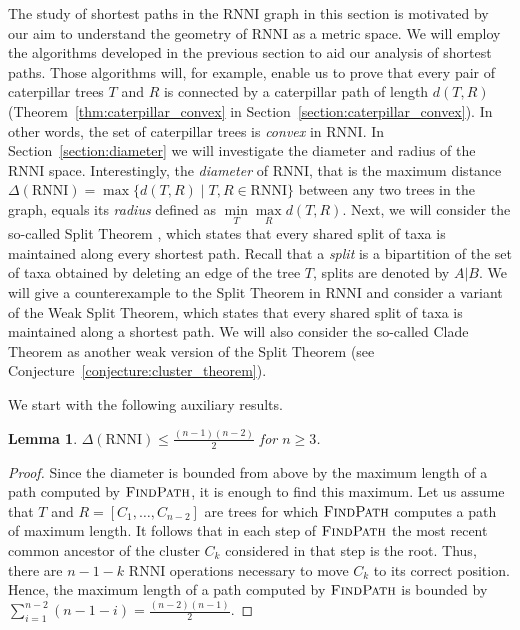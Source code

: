 \documentclass{amsart}
\newcommand{\rnni}{\mathrm{RNNI}}
\newcommand{\findpath}{\textsc{FindPath}}
\newtheorem{lemma}[definition]{Lemma}
\begin{document}
The study of shortest paths in the $\rnni$ graph in this section is motivated by our aim to understand the geometry of $\rnni$ as a metric space.
We will employ the algorithms developed in the previous section to aid our analysis of shortest paths.
Those algorithms will, for example, enable us to prove that every pair of caterpillar trees $T$ and $R$ is connected by a caterpillar path of length $d(T,R)$ (Theorem~\ref{thm:caterpillar_convex} in Section~\ref{section:caterpillar_convex}).
In other words, the set of caterpillar trees is \emph{convex} in $\rnni$.
In Section~\ref{section:diameter} we will investigate the diameter and radius of the $\rnni$ space.
Interestingly, the \emph{diameter} of $\rnni$, that is the maximum distance $\Delta(\rnni) = \max \{d(T, R) \mid T, R \in \rnni\}$ between any two trees in the graph, equals its \emph{radius} defined as $\min\limits_T \max\limits_R d(T,R)$.
Next, we will consider the so-called Split Theorem \autocite{Gavryushkin2018-ol}, which states that every shared split of taxa is maintained along every shortest path.
Recall that a \emph{split} is a bipartition of the set of taxa obtained by deleting an edge of the tree $T$, splits are denoted by $A|B$.
We will give a counterexample to the Split Theorem in $\rnni$ and consider a variant of the Weak Split Theorem, which states that every shared split of taxa is maintained along a shortest path.
We will also consider the so-called Clade Theorem as another weak version of the Split Theorem (see Conjecture~\ref{conjecture:cluster_theorem}).

We start with the following auxiliary results.

\begin{lemma}
$\Delta(\rnni) \leq \frac{(n-1)(n-2)}{2}$ for $n \geq 3$.
\label{lemma:diameter_bound}
\end{lemma}

\begin{proof}
Since the diameter is bounded from above by the maximum length of a path computed by $\findpath$, it is enough to find this maximum.
Let us assume that $T$ and $R = [C_1, \ldots, C_{n-2}]$ are trees for which $\findpath$ computes a path of maximum length.
It follows that in each step of $\findpath$ the most recent common ancestor of the cluster $C_k$ considered in that step is the root.
Thus, there are $n-1-k$ $\rnni$ operations necessary to move $C_k$ to its correct position.
Hence, the maximum length of a path computed by $\findpath$ is bounded by $\sum\limits_{i = 1}^{n-2} (n-1-i) = \frac{(n-2)(n-1)}{2}$.
\end{proof}
\end{document}
